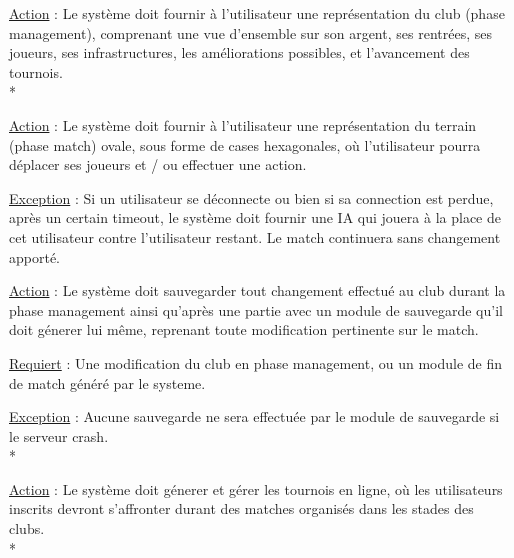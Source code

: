 \documentclass[a4paper]{article}
\begin{document}
\begin{description}[style=nextline]
\item[Représenter phase management :]
\begin{description}[leftmargin=*] %
\item \underline{Action} : Le système doit fournir à l'utilisateur une représentation du \gls{club} (phase management), comprenant une vue d'ensemble sur son argent, ses rentrées, ses joueurs, ses infrastructures, les améliorations possibles, et l'avancement des tournois.\\*
\end{description} %

\item[Représenter phase match :]
\begin{description}[leftmargin=*] %
\item \underline{Action} : Le système doit fournir à l'utilisateur une représentation du terrain (phase match) ovale, sous forme de cases hexagonales, où l'utilisateur pourra déplacer ses joueurs et / ou effectuer une action.
\item \underline{Exception} : Si un utilisateur se déconnecte ou bien si sa connection est perdue, après un certain timeout, le système doit fournir une IA qui jouera à la place de cet utilisateur contre l'utilisateur restant. Le match continuera sans changement apporté.
\end{description} %

\item[Sauvegarder :]
\begin{description}[leftmargin=*] %
\item \underline{Action} : Le système doit sauvegarder tout changement effectué au \gls{club} durant la phase management ainsi qu'après une partie avec un module de sauvegarde qu'il doit génerer lui même, reprenant toute modification pertinente sur le match.
\item \underline{Requiert} : Une modification du club en phase management, ou un module de fin de match généré par le systeme. 
\item \underline{Exception} : Aucune sauvegarde ne sera effectuée par le module de sauvegarde si le serveur crash.\\*
\end{description} %

\item[Gérer les tournois :]
\begin{description}[leftmargin=*] %
\item \underline{Action} : Le système doit génerer et gérer les tournois en ligne, où les utilisateurs inscrits devront s'affronter durant des matches organisés dans les stades des clubs.\\*
\end{description} %

\end{description}
\end{document}
